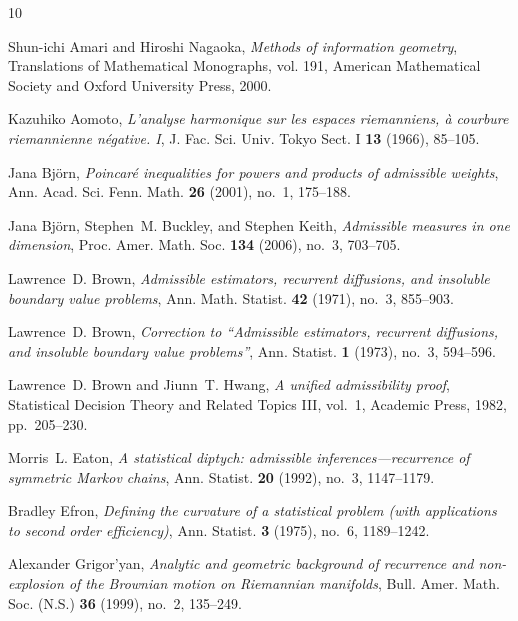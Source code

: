 \documentclass[11pt]{amsart}
\theoremstyle{plain}
\theoremstyle{definition}
\theoremstyle{remark}
\begin{document}
{\small
\begin{thebibliography}{10}

Shun-ichi Amari and Hiroshi Nagaoka, \emph{Methods of information geometry},
  Translations of Mathematical Monographs, vol. 191, American Mathematical
  Society and Oxford University Press, 2000.

Kazuhiko Aomoto, \emph{L'analyse harmonique sur les espaces riemanniens, \`a
  courbure riemannienne n\'egative. {I}}, J. Fac. Sci. Univ. Tokyo Sect. I
  \textbf{13} (1966), 85--105.

Jana Bj{\"o}rn, \emph{Poincar\'e inequalities for powers and products of
  admissible weights}, Ann. Acad. Sci. Fenn. Math. \textbf{26} (2001), no.~1,
  175--188.

Jana Bj{\"o}rn, Stephen~M. Buckley, and Stephen Keith, \emph{Admissible measures
  in one dimension}, Proc. Amer. Math. Soc. \textbf{134} (2006), no.~3,
  703--705.

Lawrence~D. Brown, \emph{Admissible estimators, recurrent diffusions, and
  insoluble boundary value problems}, Ann. Math. Statist. \textbf{42} (1971),
  no.~3, 855--903.

Lawrence~D. Brown, \emph{Correction to ``Admissible estimators, recurrent
  diffusions, and insoluble boundary value problems''}, Ann. Statist.
  \textbf{1} (1973), no.~3, 594--596.

Lawrence~D. Brown and Jiunn~T. Hwang, \emph{A unified admissibility proof},
  Statistical Decision Theory and Related Topics III, vol.~1, Academic Press,
  1982, pp.~205--230.

Morris~L. Eaton, \emph{A statistical diptych: admissible
  inferences---recurrence of symmetric {M}arkov chains}, Ann. Statist.
  \textbf{20} (1992), no.~3, 1147--1179.

Bradley Efron, \emph{Defining the curvature of a statistical problem (with
  applications to second order efficiency)}, Ann. Statist. \textbf{3} (1975),
  no.~6, 1189--1242.

Alexander Grigor'yan, \emph{Analytic and geometric background of recurrence and
  non-explosion of the {B}rownian motion on {R}iemannian manifolds}, Bull.
  Amer. Math. Soc. (N.S.) \textbf{36} (1999), no.~2, 135--249.


\end{thebibliography}}
\end{document}
